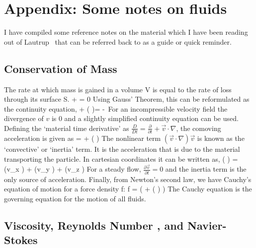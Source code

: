 \documentclass[pre,twocolumn,groupedaddress]{revtex4}
\begin{document}
{\newpage
\section{Appendix: Some notes on fluids} \label{sec:fluids}

I have compiled some reference notes on the material which I have
been reading out of Lautrup~\cite{Lautrup} that can be referred back
to as a guide or quick reminder.


\subsection{Conservation of Mass}
\label{sec:ConsMass}
 The rate at which mass is gained in a volume V is equal to the rate
 of loss through its surface S.
 \beq
   +  =
  0
  \eeq
Using Gauss' Theorem, this can be reformulated as the continuity
equation, \beq
  + ( \cdot \nabla)\rho =
 -\rho \, \nabla \cdot {}
 \eeq
 For an incompressible velocity field the divergence of $v$ is 0 and
 a slightly simplified continuity equation can be used.
Defining the `material time derivative' as $\frac{D}{Dt} =
\frac{\partial}{\partial t} + \vec{v} \cdot \nabla$, the comoving
acceleration is given as
 \beq
  =  + ( \cdot \nabla)
 \eeq
 The nonlinear term $(\vec{v} \cdot \nabla)\vec{v}$ is known as the
`convective'
 or `inertia' term.  It is the acceleration that is due to the
 material transporting the particle.  In cartesian coordinates it
 can be written as,
 \beq
( \cdot \nabla) = (v_{x} ) + (v_{y} ) + (v_{z} )
  \eeq
  For a steady flow, $\frac{\partial \vec{v}}{\partial t} = 0$ and
  the inertia term is the only source of acceleration.  Finally,
  from Newton's second law, we have Cauchy's equation of motion for a force
  density f:
  \beq
  f = \rho \left(
     + ( \cdot \nabla)
        \right)
  \eeq
  The Cauchy equation is the governing equation for the motion of
  all fluids.

  \subsection{Viscosity, Reynolds Number \Reynolds, and Navier-Stokes}
\label{sec:Rey}

}
\end{document}
